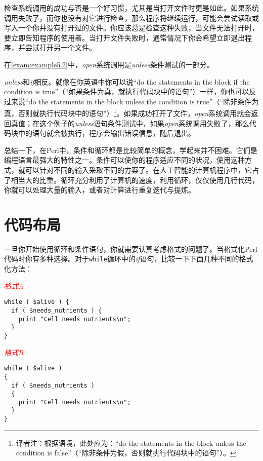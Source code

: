 检查系统调用的成功与否是一个好习惯，尤其是当打开文件时更是如此。如果系统调用失败了，而你也没有对它进行检查，那么程序将继续运行，可能会尝试读取或写入一个你并没有打开过的文件。你应该总是检查这种失败，当文件无法打开时，要立即告知程序的使用者。当打开文件失败时，通常情况下你会希望立即退出程序，并尝试打开另一个文件。

在\autoref{exam:example5.2}中，\textit{open}系统调用是\textit{unless}条件测试的一部分。

\textit{unless}和\textit{if}相反。就像在你英语中你可以说“do the statements in the block if the condition is true”（“如果条件为真，就执行代码块中的语句”）一样，你也可以反过来说“do the statements in the block unless the condition is true”（“除非条件为真，否则就执行代码块中的语句”）\footnote{译者注：根据语境，此处应为：“do the statements in the block unless the condition is false”（“除非条件为假，否则就执行代码块中的语句”）。}。如果成功打开了文件，\textit{open}系统调用就会返回真值；在这个例子的\textit{unless}语句条件测试中，如果\textit{open}系统调用失败了，那么代码块中的语句就会被执行，程序会输出错误信息，随后退出。

总结一下，在Perl中，条件和循环都是比较简单的概念，学起来并不困难。它们是编程语言最强大的特性之一。条件可以使你的程序适应不同的状况，使用这种方式，就可以针对不同的输入采取不同的方案了。在人工智能的计算机程序中，它占了相当大的比重。循环充分利用了计算机的速度，利用循环，仅仅使用几行代码，你就可以处理大量的输入，或者对计算进行重复迭代与提炼。

\section{代码布局}
\label{sect:section5.2}
一旦你开始使用循环和条件语句，你就需要认真考虑格式的问题了。当格式化Perl代码时你有多种选择。对于\verb|while|循环中的\textit{if}语句，比较一下下面几种不同的格式化方法：

\textcolor{red}{\textit{格式A}}
\begin{adjustwidth}{4em}{}
\begin{lstlisting}
while ( $alive ) {
  if ( $needs_nutrients ) {
    print "Cell needs nutrients\n";
  }
}
\end{lstlisting}
\end{adjustwidth}

\textcolor{red}{\textit{格式B}}
\begin{adjustwidth}{4em}{}
\begin{lstlisting}
while ( $alive )
{
  if ( $needs_nutrients )
  {
    print "Cell needs nutrients\n";
  }
}
\end{lstlisting}
\end{adjustwidth}

